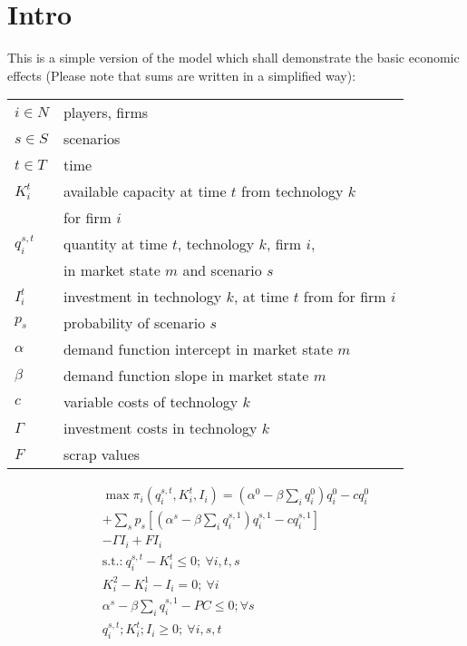 \documentclass[a4paper,12pt]{article}
\theoremstyle{remark}
\begin{document}
  \section{Intro}

This is a simple version of the model which shall demonstrate the basic economic effects (Please note that sums are written in a simplified way):

\begin{tabular}[c]{l l}
$i\in N$        & players, firms\\
$s\in S$       	& scenarios\\
$t\in T$	& time \\
$K_{i}^t$      & available capacity at time $t$ from technology $k$ \\
                & for firm $i$ \\
$q_{i}^{s,t}$ & quantity at time $t$, technology $k$, firm $i$, \\
                & in market state $m$ and scenario $s$ \\			
$I_{i}^t$   & investment in technology $k$, at time $t$ from for firm $i$\\
$p_s$        & probability of scenario $s$\\
$\alpha$  & demand function intercept in market state $m$ \\
$\beta$   & demand function slope in market state $m$ \\
$c$	     & variable costs of technology $k$	\\
$\Gamma$   & investment costs in technology $k$  \\
$F$        & scrap values  \\
\end{tabular}

\begin{gather}
	\max \pi_i(q_{i}^{s,t},K^t_{i},I_{i})=  (\alpha^0-\beta \sum_i q_{i}^{0}) q_{i}^{0} - c q_{i}^{0}  \\  \nonumber 
	+ \sum_s p_s \left[ (\alpha^s- \beta \sum_i q_{i}^{s,1}) q_{i}^{s,1} - c q_{i}^{s,1}  \right]   \\  \nonumber 
									- \Gamma I_{i} +  F I_{i}  \\       
			\text{s.t.:} \  q_{i}^{s,t} - K^{t}_{i} \leq 0; \ \forall i,t,s  \label{eq:oligopmax2}\\ 
										  K^{2}_{i}  - K^{1}_{i}  - I_{i} = 0 ; \ \forall i  \label{eq:ologopmax5} \\  
										  \alpha^s - \beta \sum_i q_i^{s,1} - PC \leq 0; \forall s \\ \nonumber 
 										  q_{i}^{s,t};K^t_{i};I_{i}	\geq 0; \ \forall i,s,t   \nonumber
\end{gather}
\end{document}
